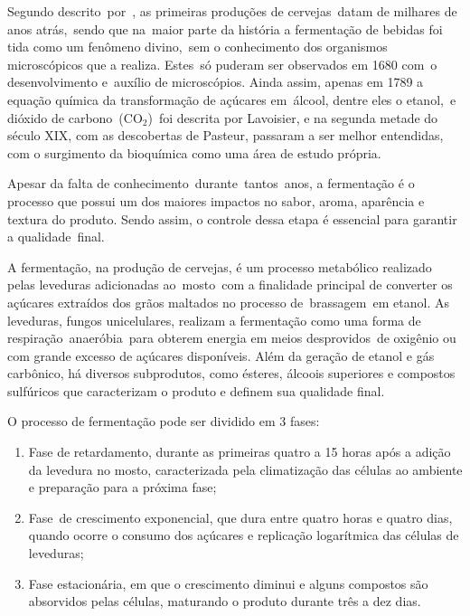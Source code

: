 Segundo descrito por , as primeiras produções de
cervejas datam de milhares de anos atrás, sendo que na maior parte da história a
fermentação de bebidas foi tida como um fenômeno divino, sem o conhecimento dos
organismos microscópicos que a realiza. Estes só puderam ser observados em 1680
com o desenvolvimento e auxílio de microscópios. Ainda assim, apenas em 1789 a
equação química da transformação de açúcares em álcool, dentre eles o etanol, e
dióxido de carbono ($\mathrm{CO_2}$) foi descrita por Lavoisier, e na segunda metade do século
XIX, com as descobertas de Pasteur, passaram a ser melhor entendidas, com o
surgimento da bioquímica como uma área de estudo própria. 


Apesar da falta de conhecimento durante tantos anos, a fermentação é o processo
que possui um dos maiores impactos no sabor, aroma, aparência e textura do
produto. Sendo assim, o controle dessa etapa é essencial para garantir a
qualidade final.  


A fermentação, na produção de cervejas, é um processo metabólico realizado pelas
leveduras adicionadas ao mosto com a finalidade principal de converter os açúcares
extraídos dos grãos maltados no processo de brassagem em etanol. As leveduras,
fungos unicelulares, realizam a fermentação como uma forma de
respiração anaeróbia para obterem energia em meios desprovidos de oxigênio ou
com grande excesso de açúcares disponíveis. Além da geração de etanol e gás
carbônico, há diversos subprodutos, como ésteres, álcoois superiores e compostos
sulfúricos que caracterizam o produto e definem sua qualidade final. 


O processo de fermentação pode ser dividido em 3 fases:  
\begin{enumerate}
    \item Fase de retardamento, durante as primeiras quatro a 15 horas após a adição
da levedura no mosto, caracterizada pela climatização das células ao
ambiente e preparação para a próxima fase;
    \item Fase de crescimento exponencial, que dura entre quatro horas e quatro dias,
quando ocorre o consumo dos açúcares e replicação logarítmica das células
de leveduras;
    \item Fase estacionária, em que o crescimento diminui e alguns compostos são
absorvidos pelas células, maturando o produto durante três a dez dias.
\end{enumerate}


